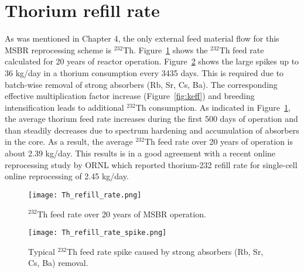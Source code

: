 \section{Thorium refill rate}
As was mentioned in Chapter 4, the only external feed material flow for this \gls{MSBR} reprocessing scheme is $^{232}$Th. Figure~\ref{fig:th_refill} shows the $^{232}$Th feed rate calculated for 20 years of reactor operation. Figure~\ref{fig:th_refill_spike} shows the large spikes up to 36 kg/day in a thorium consumption every 3435 days. This is required due to batch-wise removal of strong absorbers (Rb, Sr, Cs, Ba). The corresponding effective multiplication factor increase (Figure~\ref{fig:keff}) and breeding intensification leads to additional $^{232}$Th consumption. As indicated in Figure~\ref{fig:th_refill}, the average thorium feed rate increases during the first 500 days of operation and than steadily decreases due to spectrum hardening and accumulation of absorbers in the core. As a result, the average $^{232}$Th feed rate over 20 years of operation is about 2.39 kg/day. This results is in a good agreement with a recent online reprocessing study by \gls{ORNL} \cite{betzler_molten_2017} which reported thorium-232 refill rate for single-cell online reprocessing of 2.45 kg/day.

\begin{figure}[htp!] %
  \centering
    \vspace{-0.3em}
  \texttt{[image: Th\_refill\_rate.png]} 
      \vspace{-1.5em}
  \caption{$^{232}$Th feed rate over 20 years of \gls{MSBR} operation.}
    \vspace{-0.6em}
  \label{fig:th_refill}
\end{figure}
\begin{figure}[htp!] %
  \centering
    \vspace{-0.3em}
  \texttt{[image: Th\_refill\_rate\_spike.png]} 
      \vspace{-1.5em}
  \caption{Typical $^{232}$Th feed rate spike caused by strong absorbers (Rb, Sr, Cs, Ba) removal.}
    \vspace{-0.6em}
  \label{fig:th_refill_spike}
\end{figure}
\FloatBarrier
